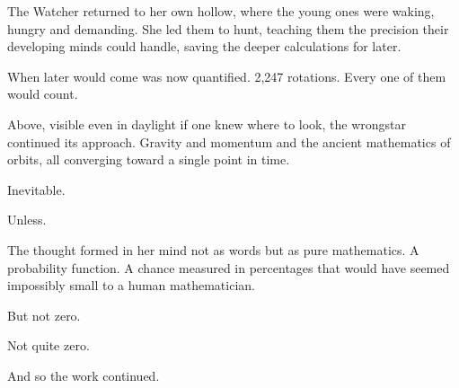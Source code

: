 The Watcher returned to her own hollow, where the young ones were waking, hungry and demanding. She led them to hunt, teaching them the precision their developing minds could handle, saving the deeper calculations for later.

When later would come was now quantified. 2,247 rotations. Every one of them would count.

Above, visible even in daylight if one knew where to look, the wrongstar continued its approach. Gravity and momentum and the ancient mathematics of orbits, all converging toward a single point in time.

Inevitable.

Unless.

The thought formed in her mind not as words but as pure mathematics. A probability function. A chance measured in percentages that would have seemed impossibly small to a human mathematician.

But not zero.

Not quite zero.

And so the work continued.

